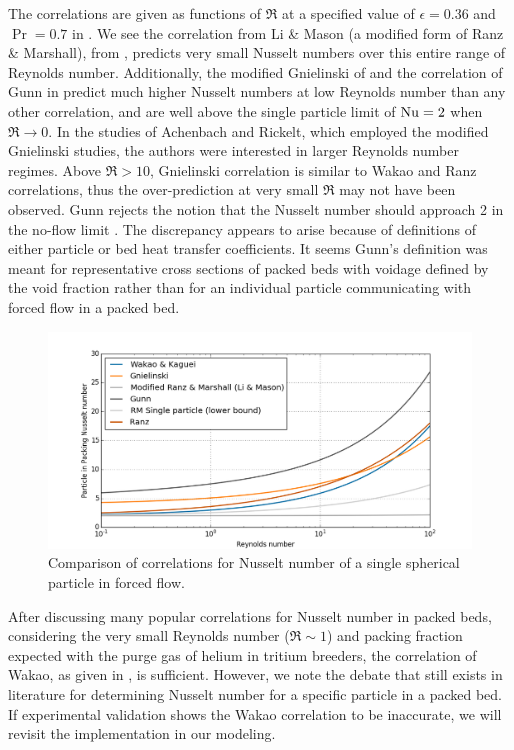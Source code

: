 The correlations are given as functions of $\Re$ at a specified value of $\epsilon = 0.36$ and $\Pr = 0.7$ in . We see the correlation from Li \& Mason (a modified form of Ranz \& Marshall), from , predicts very small Nusselt numbers over this entire range of Reynolds number. Additionally, the modified Gnielinski of  and the correlation of Gunn in  predict much higher Nusselt numbers at low Reynolds number than any other correlation, and are well above the single particle limit of $\mathrm{Nu} = 2$ when $\Re \rightarrow 0$. In the studies of Achenbach and Rickelt, which employed the modified Gnielinski studies, the authors were interested in larger Reynolds number regimes. Above $\Re > 10$, Gnielinski correlation is similar to Wakao and Ranz correlations, thus the over-prediction at very small $\Re$ may not have been observed. Gunn rejects the notion that the Nusselt number should approach 2 in the no-flow limit \cite{Gunn1978}. The discrepancy appears to arise because of definitions of either particle or bed heat transfer coefficients. It seems Gunn's definition was meant for representative cross sections of packed beds with voidage defined by the void fraction rather than for an individual particle communicating with forced flow in a packed bed. 

\begin{figure}[!h]
    \centering
    \includegraphics[width=\singleimagewidth]{figures/Nusselt-packing}
    \caption{Comparison of correlations for Nusselt number of a single spherical particle in forced flow.}
    \label{fig:Nu-packed}
\end{figure}

After discussing many popular correlations for Nusselt number in packed beds, considering the very small Reynolds number ($\Re \sim 1$) and packing fraction expected with the purge gas of helium in tritium breeders, the correlation of Wakao\etal, as given in , is sufficient. However, we note the debate that still exists in literature for determining Nusselt number for a specific particle in a packed bed. If experimental validation shows the Wakao correlation to be inaccurate, we will revisit the implementation in our modeling.

